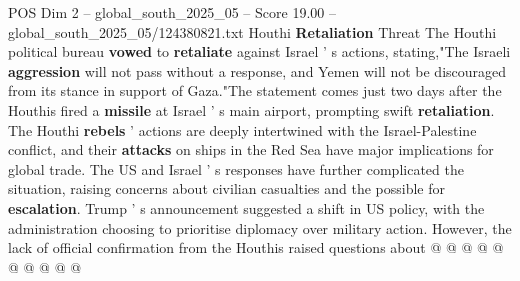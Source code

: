 \begin{textsample}{POS Dim 2 – global\_south\_2025\_05 – Score 19.00 – global\_south\_2025\_05/124380821.txt}
Houthi \textbf{Retaliation} Threat The Houthi political bureau \textbf{vowed} to \textbf{retaliate} against Israel ' s actions, stating,"The Israeli \textbf{aggression} will not pass without a response, and Yemen will not be discouraged from its stance in support of Gaza."The statement comes just two days after the Houthis fired a \textbf{missile} at Israel ' s main airport, prompting swift \textbf{retaliation}.
The Houthi \textbf{rebels} ' actions are deeply intertwined with the Israel-Palestine conflict, and their \textbf{attacks} on ships in the Red Sea have major implications for global trade.
The US and Israel ' s responses have further complicated the situation, raising concerns about civilian casualties and the possible for \textbf{escalation}.
Trump ' s announcement suggested a shift in US policy, with the administration choosing to prioritise diplomacy over military action.
However, the lack of official confirmation from the Houthis raised questions about @ @ @ @ @ @ @ @ @ @

\end{textsample}

